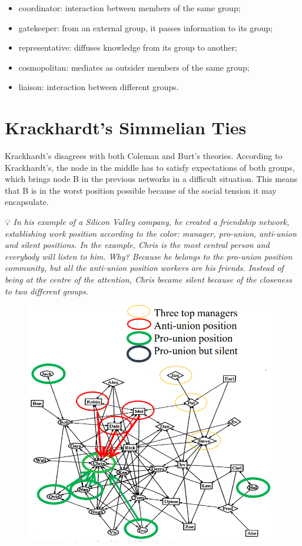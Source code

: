 \documentclass[
  notitlepage,
  onecolumn,
  openany]{book}
\providecommand{\tightlist}{%
  \setlength{\itemsep}{0pt}\setlength{\parskip}{0pt}}
\begin{document}
\begin{itemize}
\tightlist
\item
  coordinator: interaction between members of the same group;
\item
  gatekeeper: from an external group, it passes information to its
  group;
\item
  representative: diffuses knowledge from its group to another;
\item
  cosmopolitan: mediates as outsider members of the same group;
\item
  liaison: interaction between different groups.
\end{itemize}

\hypertarget{krackhardts-simmelian-ties}{%
\section{Krackhardt's Simmelian Ties}\label{krackhardts-simmelian-ties}}

Krackhardt's disagrees with both Coleman and Burt's theories. According
to Krackhardt's, the node in the middle has to satisfy expectations of
both groups, which brings node B in the previous networks in a difficult
situation. This means that B is in the worst position possible because
of the social tension it may encapsulate.

💡 \emph{In his example of a Silicon Valley company, he created a friendship
network, establishing work position according to the color: manager,
pro-union, anti-union and silent positions. In the example, Chris is the
most central person and everybody will listen to him. Why? Because he
belongs to the pro-union position community, but all the anti-union
position workers are his friends. Instead of being at the centre of the
attention, Chris became silent because of the closeness to two different
groups.}

\begin{figure}[h!]

{\centering \includegraphics[width=0.5\linewidth]{images/07-Triads and structural holes/Untitled 3} 

}

\end{figure}
\end{document}
